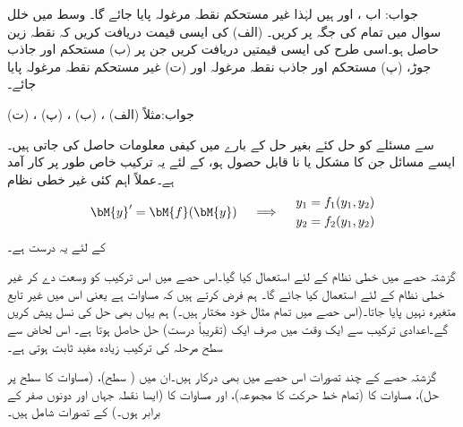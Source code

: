 جواب: اب ،  اور  ہیں لہٰذا غیر مستحکم نقطہ مرغولہ پایا جائے گا۔
 \quad وسط میں خلل\\
سوال  میں تمام  کی جگہ  پر کریں۔ (الف)  کی ایسی قیمت دریافت کریں کہ نقطہ زین حاصل ہو۔اسی طرح  کی ایسی قیمتیں دریافت کریں جن پر (ب) مستحکم اور جاذب جوڑ، (پ) مستحکم اور جاذب نقطہ مرغولہ اور (ت) غیر مستحکم نقطہ مرغولہ پایا جائے۔

جواب:مثلاً (الف) ، (ب) ، (پ) ، (ت) 

 سے مسئلے کو حل کئے بغیر حل کے بارے میں کیفی معلومات حاصل کی جاتی ہیں۔ایسے مسائل جن کا  مشکل یا نا قابل حصول ہو، کے لئے یہ ترکیب خاص طور پر کار آمد ہے۔عملاً اہم کئی غیر خطی نظام
\begin{gather}\label{مساوات_نظام_غیر_خطی_ترکیب_مرحلہ_الف}
\begin{aligned}
\bM{y}'=\bM{f}(\bM{y})
\end{aligned}\quad \implies \quad 
\begin{aligned}
y_1&=f_1(y_1,y_2)\\
y_2&=f_2(y_1,y_2)
\end{aligned}
\end{gather}
کے لئے یہ درست ہے۔

گزشتہ حصے میں  خطی نظام کے لئے استعمال کیا گیا۔اس حصے میں اس ترکیب کو وسعت دے کر غیر خطی نظام کے لئے استعمال کیا جائے گا۔ ہم فرض کرتے ہیں کہ مساوات   ہے یعنی اس میں غیر تابع متغیرہ   نہیں پایا جاتا۔(اس حصے میں تمام مثال خود مختار ہیں۔) ہم یہاں بھی حل کی نسل پیش کریں گے۔اعدادی ترکیب سے ایک وقت میں صرف ایک (تقریباً درست) حل حاصل ہوتا ہے۔ اس لحاض سے سطح مرحلہ کی ترکیب زیادہ مفید ثابت ہوتی ہے۔

گزشتہ حصے کے چند تصورات اس حصے میں بھی درکار ہیں۔ان میں  ( سطح)،  (مساوات  کا  سطح پر حل)، مساوات  کا  (تمام خط حرکت کا مجموعہ)،  اور مساوات  کا  (ایسا نقطہ  جہاں  اور  دونوں صفر کے برابر ہوں۔) کے تصورات شامل ہیں۔

